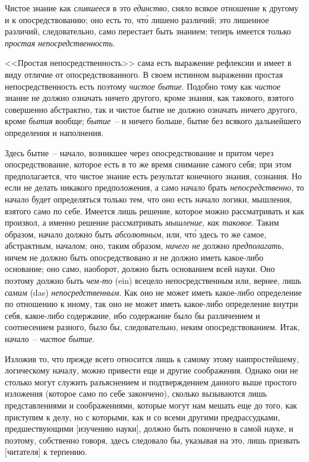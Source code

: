 Чистое знание как \emph{слившееся} в это \emph{единство}, сняло
всякое отношение к другому и к опосредствованию; оно
есть то, чт\'о лишено различий; это лишенное различий,
следовательно, само перестает быть знанием; теперь
имеется только \emph{простая непосредственность}.

<<Простая непосредственность>> сама есть выражение
рефлексии и имеет в виду отличие от опосредствованного.
В своем истинном выражении простая непосредственность
есть поэтому \emph{чистое бытие}. Подобно тому как \emph{чистое}
знание не должно означать ничего другого, кроме
знания, как такового, взятого совершенно абстрактно, так
и чистое бытие не должно означать ничего другого, кроме
\emph{бытия} вообще; \emph{бытие}~-- и ничего больше, бытие без
всякого дальнейшего определения и наполнения.

Здесь бытие~-- начало, возникшее через опосредствование
и притом через опосредствование, которое есть
в то же время снимание самого себя; при этом предполагается,
что чистое знание есть результат конечного знания,
сознания. Но если не делать никакого предположения,
а само начало брать \emph{непосредственно}, то начало будет
определяться только тем, что оно есть начало логики,
мышления, взятого само по себе. Имеется лишь решение,
которое можно рассматривать и как произвол,
а именно решение рассматривать \emph{мышление, как таковое}.
Таким образом, начало должно быть \emph{абсолютным}, или, чт\'о
здесь то же самое, абстрактным, началом; оно, таким
образом, \emph{ничего не} должно \emph{предполагать}, ничем не должно
быть опосредствовано и не должно иметь какое-либо
основание; оно само, наоборот, должно быть основанием
всей науки. Оно поэтому должно быть \emph{чем-то} (ein) всецело
непосредственным или, вернее, лишь \emph{самим} (das)
\emph{непосредственным}. Как оно не может иметь какое-либо
определение по отношению к иному, так оно не может
иметь какое-либо определение внутри себя, какое-либо
содержание, ибо содержание было бы различением и соотнесением
разного, было бы, следовательно, неким опосредствованием.
Итак, начало~-- \emph{чистое бытие}.

Изложив то, что прежде всего относится лишь к самому
этому наипростейшему, логическому началу, можно
привести еще и другие соображения. Однако они не
столько могут служить разъяснением и подтверждением
данного выше простого изложения (которое само по себе
закончено), сколько вызываются лишь представлениями
и соображениями, которые могут нам мешать еще до
того, как приступим к делу, но с которыми, как и со
всеми другими предрассудками, предшествующими [изучению
науки], должно быть покончено в самой науке, и
поэтому, собственно говоря, здесь следовало бы, указывая
на это, лишь призвать [читателя] к терпению.

